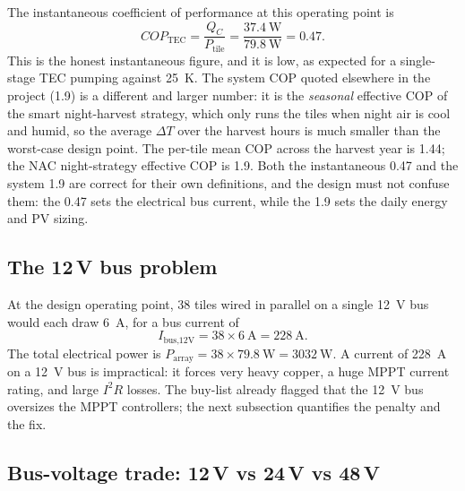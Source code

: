 \documentclass[11pt,a4paper]{article}
\begin{document}
The instantaneous coefficient of performance at this operating point is
\begin{equation}
  COP_{\text{TEC}} = \frac{Q_C}{P_{\text{tile}}}
  = \frac{\SI{37.4}{\watt}}{\SI{79.8}{\watt}} = \num{0.47}.
  \label{eq:cop}
\end{equation}
This is the honest instantaneous figure, and it is low, as expected for a
single-stage TEC pumping against \SI{25}{\kelvin}. The system COP quoted elsewhere
in the project (\num{1.9}) is a different and larger number: it is the
\emph{seasonal} effective COP of the smart night-harvest strategy, which only
runs the tiles when night air is cool and humid, so the average $\Delta T$ over
the harvest hours is much smaller than the worst-case design point. The per-tile
mean COP across the harvest year is \num{1.44}; the NAC night-strategy effective
COP is \num{1.9}. Both the instantaneous \num{0.47} and the system \num{1.9} are
correct for their own definitions, and the design must not confuse them: the
\num{0.47} sets the electrical bus current, while the \num{1.9} sets the daily
energy and PV sizing.

\subsection{The 12\,V bus problem}

At the design operating point, \num{38} tiles wired in parallel on a single
\SI{12}{\volt} bus would each draw \SI{6}{\ampere}, for a bus current of
\begin{equation}
  I_{\text{bus,12V}} = 38\times\SI{6}{\ampere} = \SI{228}{\ampere}.
  \label{eq:ibus12}
\end{equation}
The total electrical power is
$P_{\text{array}} = 38\times\SI{79.8}{\watt} = \SI{3032}{\watt}$. A current of
\SI{228}{\ampere} on a \SI{12}{\volt} bus is impractical: it forces very heavy
copper, a huge MPPT current rating, and large $I^2R$ losses. The buy-list already
flagged that the \SI{12}{\volt} bus oversizes the MPPT controllers; the next
subsection quantifies the penalty and the fix.

\subsection{Bus-voltage trade: 12\,V vs 24\,V vs 48\,V}
\end{document}
